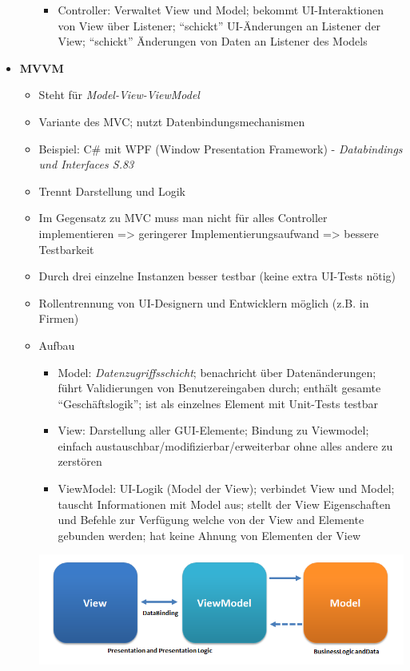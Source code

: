 \documentclass[a4paper, 11pt]{article}
\begin{document}
\begin{itemize}
\begin{itemize}
\begin{itemize}
			            \item Controller: Verwaltet View und Model; bekommt UI-Interaktionen von View über Listener; \enquote{schickt} UI-Änderungen an Listener der View; \enquote{schickt} Änderungen von Daten an Listener des Models
		            \end{itemize}
		            
	      \end{itemize}
	\item \textbf{MVVM}
	      \begin{itemize}
		      \item Steht für \textit{Model-View-ViewModel}
		      \item Variante des MVC; nutzt Datenbindungsmechanismen
		      \item Beispiel: C\# mit WPF (Window Presentation Framework) - \textit{Databindings und Interfaces S.83}
		      \item Trennt Darstellung und Logik
		      \item Im Gegensatz zu MVC muss man nicht für alles Controller implementieren => geringerer Implementierungsaufwand => bessere Testbarkeit
		      \item Durch drei einzelne Instanzen besser testbar (keine extra UI-Tests nötig)
		      \item Rollentrennung von UI-Designern und Entwicklern möglich (z.B. in Firmen)
		      \item Aufbau
		            \begin{itemize}
			            \item Model: \textit{Datenzugriffsschicht}; benachricht über Datenänderungen; führt Validierungen von Benutzereingaben durch; enthält gesamte \enquote{Geschäftslogik}; ist als einzelnes Element mit Unit-Tests testbar
			            \item View: Darstellung aller GUI-Elemente; Bindung zu Viewmodel; einfach austauschbar/modifizierbar/erweiterbar ohne alles andere zu zerstören
			            \item ViewModel: UI-Logik (Model der View); verbindet View und Model; tauscht Informationen mit Model aus; stellt der View Eigenschaften und Befehle zur Verfügung welche von der View and Elemente gebunden werden; hat keine Ahnung von Elementen der View
		            \end{itemize}
		            \includegraphics[width=15cm]{mvvm}
	      \end{itemize}
\end{itemize}
\end{document}
